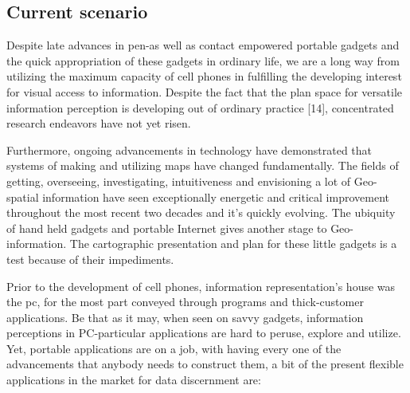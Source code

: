 \subsection{Current scenario}

Despite late advances in pen-as well as contact empowered portable gadgets and the quick appropriation of these gadgets in ordinary life, we are a long way from utilizing the maximum capacity of cell phones in fulfilling the developing interest for visual access to information. Despite the fact that the plan space for versatile  information perception is developing out of ordinary practice [14], concentrated research endeavors have not yet risen.

Furthermore, ongoing advancements in technology have demonstrated that systems of making and utilizing maps have changed fundamentally. The fields of getting, overseeing, investigating, intuitiveness and envisioning a lot of Geo-spatial information have seen exceptionally energetic and critical improvement throughout the most recent two decades and it's quickly evolving. The ubiquity of hand held gadgets and portable Internet gives another stage to Geo-information. The cartographic presentation and plan for these little gadgets is a test because of their impediments.

Prior to the development of cell phones, information representation's house was the \gls{pc}, for the most part conveyed through programs and thick-customer applications. Be that as it may, when seen on savvy gadgets, information perceptions in PC-particular applications are hard to peruse, explore and utilize. Yet, portable applications are on a job, with having every one of the advancements that anybody needs to construct them, a bit of the present flexible applications in the market for data discernment are:


